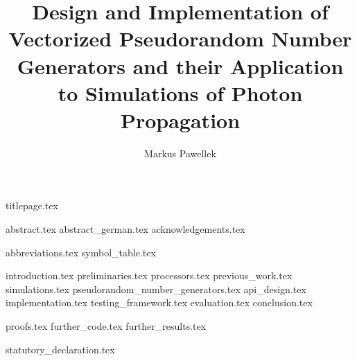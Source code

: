 \documentclass[fleqn,10pt,twoside]{stdglobal}
\title{Design and Implementation of Vectorized Pseudorandom Number Generators and their Application to Simulations of Photon Propagation}
\author{Markus Pawellek}
\let\oldpagenumbering\pagenumbering
\renewcommand*\pagenumbering[1]{\cleardoublepage\oldpagenumbering{#1}}
\begin{document}

  {titlepage.tex}

  {abstract.tex}
  \cleardoublepage
  {abstract_german.tex}
  {acknowledgements.tex}

  \tableofcontents
  \listoffigures
  \listoftables
  \listofmath
  \listofcode
  {abbreviations.tex}
  {symbol_table.tex}

  {introduction.tex}
  {preliminaries.tex}
  {processors.tex}
  {previous_work.tex}
  {simulations.tex}
  {pseudorandom_number_generators.tex}
  {api_design.tex}
  {implementation.tex}
  {testing_framework.tex}
  {evaluation.tex}
  {conclusion.tex}
  \printbibliography[heading=bibintoc]

  \appendix
  {proofs.tex}
  {further_code.tex}
  {further_results.tex}

  {statutory_declaration.tex}
\end{document}
